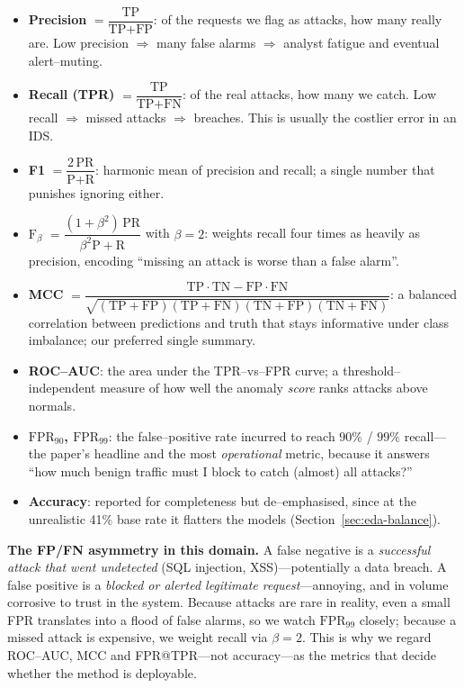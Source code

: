 \documentclass[11pt,a4paper]{article}
\begin{document}
\begin{itemize}[nosep,leftmargin=1.4em]
  \item \textbf{Precision} $=\dfrac{\text{TP}}{\text{TP}+\text{FP}}$: of the requests we
        flag as attacks, how many really are. Low precision $\Rightarrow$ many false
        alarms $\Rightarrow$ analyst fatigue and eventual alert--muting.
  \item \textbf{Recall (TPR)} $=\dfrac{\text{TP}}{\text{TP}+\text{FN}}$: of the real
        attacks, how many we catch. Low recall $\Rightarrow$ missed attacks $\Rightarrow$
        breaches. This is usually the costlier error in an IDS.
  \item \textbf{F1} $=\dfrac{2\,\text{PR}}{\text{P}+\text{R}}$: harmonic mean of precision
        and recall; a single number that punishes ignoring either.
  \item \textbf{$\text{F}_\beta$}
        $=\dfrac{(1+\beta^2)\,\text{PR}}{\beta^2\text{P}+\text{R}}$ with $\beta=2$: weights
        recall four times as heavily as precision, encoding ``missing an attack is worse
        than a false alarm''.
  \item \textbf{MCC} $=\dfrac{\text{TP}\cdot\text{TN}-\text{FP}\cdot\text{FN}}
        {\sqrt{(\text{TP}{+}\text{FP})(\text{TP}{+}\text{FN})(\text{TN}{+}\text{FP})(\text{TN}{+}\text{FN})}}$:
        a balanced correlation between predictions and truth that stays informative under
        class imbalance; our preferred single summary.
  \item \textbf{ROC--AUC}: the area under the TPR--vs--FPR curve; a threshold--independent
        measure of how well the anomaly \emph{score} ranks attacks above normals.
  \item \textbf{$\text{FPR}_{90}$, $\text{FPR}_{99}$}: the false--positive rate incurred to
        reach $90\%$ / $99\%$ recall---the paper's headline and the most
        \emph{operational} metric, because it answers ``how much benign traffic must I
        block to catch (almost) all attacks?''
  \item \textbf{Accuracy}: reported for completeness but de--emphasised, since at the
        unrealistic 41\% base rate it flatters the models (Section~\ref{sec:eda-balance}).
\end{itemize}
\noindent\textbf{The FP/FN asymmetry in this domain.} A false negative is a
\emph{successful attack that went undetected} (SQL injection, XSS)---potentially a data
breach. A false positive is a \emph{blocked or alerted legitimate request}---annoying, and
in volume corrosive to trust in the system. Because attacks are rare in reality, even a
small FPR translates into a flood of false alarms, so we watch $\text{FPR}_{99}$ closely;
because a missed attack is expensive, we weight recall via $\beta=2$. This is why we regard
ROC--AUC, MCC and FPR@TPR---not accuracy---as the metrics that decide whether the method is
deployable.
\end{document}

